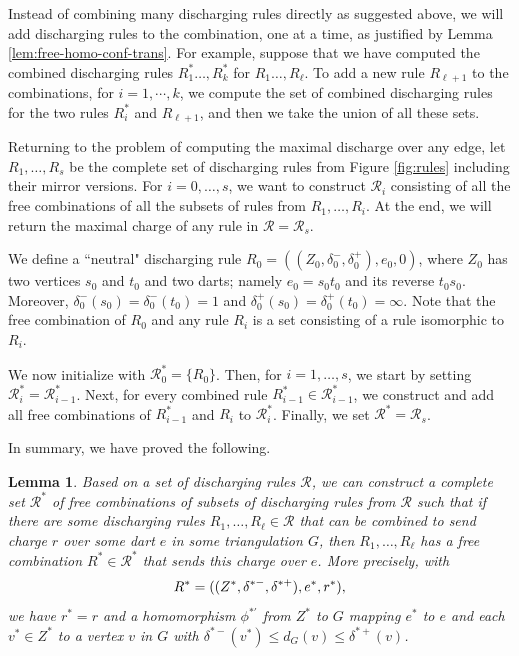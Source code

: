 \documentclass[10pt,a4paper]{article}
\newtheorem{lem}[thm]{Lemma}
\def\cR{{\mathcal R}}
\newcommand\drop[1]{}
\begin{document}
Instead of combining many discharging rules directly as suggested above, we will add discharging rules to the combination, one at a time,
as justified by Lemma \ref{lem:free-homo-conf-trans}. For example, suppose that we have computed the combined discharging rules $R^*_1\ldots,R^*_k$ for $R_1\ldots,R_\ell$. To add a new rule $R_{\ell+1}$ to the combinations, for $i=1,\cdots,k$, we
compute the set of combined discharging rules for the two rules $R^*_i$ and $R_{\ell+1}$, and then we take the union of all these sets.

\drop{To upper-bound the charge along any oriented edge, we look for the free combination yielding the maximal charge (charge two for the first rule and charge one for every other rule). 
With 43 rules, 84 including two orientations of all but two of them, there could potentially be $2^{84}$ combinations to consider. What saves
us is that most discharging rules cannot be combined, and if some rules cannot be combined, then neither can any superset of these rules.}

Returning to the problem of computing the maximal discharge over any edge, 
let $R_1,\ldots,R_s$ be the complete set of discharging rules from Figure \ref{fig:rules} including their mirror versions. For $i=0,\ldots,s$, we want to
construct $\cR_i$ consisting of all the free combinations of all the subsets of rules from $R_1,\ldots,R_i$. At the end, we will return the
maximal charge of any rule in $\cR=\cR_s$.

We define a ``neutral" discharging rule $R_0 = ((Z_0,\delta^-_0,\delta^+_0),e_0,0)$,
where $Z_0$ has two vertices $s_0$ and $t_0$ and two darts; namely $e_0=s_0t_0$ and its reverse $t_0s_0$.
Moreover, $\delta_0^-(s_0)=\delta^-_0(t_0)=1$ and $\delta^+_0(s_0)=\delta_0^+(t_0)=\infty$. 
Note that the free combination of $R_0$ and any rule $R_i$ is a set consisting of a rule isomorphic to $R_i$. 

We now initialize with 
$\cR^*_0=\{R_0\}$. Then, for $i=1,\ldots,s$,
we start by setting $\cR^*_i=\cR^*_{i-1}$. Next,
for every combined rule
$R^*_{i-1}\in \cR^*_{i-1}$, we
construct and add all free combinations of $R^*_{i-1}$ and $R_i$ to $\cR^*_i$. Finally, we set $\cR^*=\cR_s$.

In summary, we have proved the following.

\begin{lem}\label{lem:free-comb-rules}
Based on a set of discharging rules 
$\cR$, we can construct a
complete set $\cR^*$ of free combinations of subsets of discharging rules from $\cR$ such that if there are
some discharging rules $R_1,\ldots,R_\ell\in\cR$ that can be combined
to send charge $r$ over some dart $e$ in some triangulation $G$, then $R_1,\ldots,R_\ell$ has a free
combination $R^*\in\cR^*$
that sends this charge over $e$. More precisely, with
\[R^*=((Z^*,\delta^{*-},\delta^{*+}),e^*,r^*)\textnormal,\]
we have $r^*=r$ and a homomorphism $\phi^{*\prime}$ from $Z^*$ to $G$ mapping
$e^*$ to $e$ and each $v^*\in Z^*$ to 
a vertex $v$ in $G$ with $\delta^{*-}(v^*)\leq d_G(v)\leq \delta^{*+}(v)$. 
\end{lem}
\end{document}
